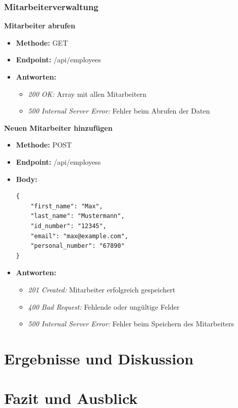 \subsubsection{Mitarbeiterverwaltung}

\textbf{Mitarbeiter abrufen}
\begin{itemize}
    \item \textbf{Methode: }GET 
    \item \textbf{Endpoint: }/api/employees
    \item \textbf{Antworten: }
    \begin{itemize}
        \item \textit{200 OK: }Array mit allen Mitarbeitern
        \item \textit{500 Internal Server Error: }Fehler beim Abrufen der Daten
    \end{itemize}
\end{itemize}

\noindent\textbf{Neuen Mitarbeiter hinzufügen}
\begin{itemize}
    \item \textbf{Methode: }POST 
    \item \textbf{Endpoint: }/api/employess  
    \item \textbf{Body: } \begin{verbatim}
{
    "first_name": "Max",
    "last_name": "Mustermann",
    "id_number": "12345",
    "email": "max@example.com",
    "personal_number": "67890"
}
    \end{verbatim}
    \item \textbf{Antworten: }
    \begin{itemize}
        \item \textit{201 Created: }Mitarbeiter erfolgreich gespeichert
        \item \textit{400 Bad Request: }Fehlende oder ungültige Felder
        \item \textit{500 Internal Server Error: }Fehler beim Speichern des Mitarbeiters
    \end{itemize}
\end{itemize}


\section{Ergebnisse und Diskussion}
\label{sec:ergebnisse_und_diskussion}



\section{Fazit und Ausblick}
\label{sec:fazit_und_ausblick}


